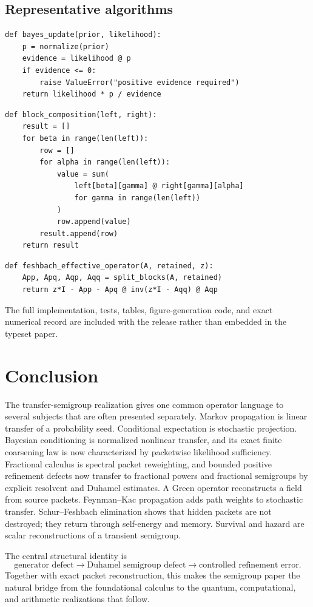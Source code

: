 \documentclass[11pt]{article}
\theoremstyle{definition}
\theoremstyle{remark}
\begin{document}
\subsection{Representative algorithms}

\begin{lstlisting}[caption={Normalized finite Bayesian update.}]
def bayes_update(prior, likelihood):
    p = normalize(prior)
    evidence = likelihood @ p
    if evidence <= 0:
        raise ValueError("positive evidence required")
    return likelihood * p / evidence
\end{lstlisting}

\begin{lstlisting}[caption={Packet block composition.}]
def block_composition(left, right):
    result = []
    for beta in range(len(left)):
        row = []
        for alpha in range(len(left)):
            value = sum(
                left[beta][gamma] @ right[gamma][alpha]
                for gamma in range(len(left))
            )
            row.append(value)
        result.append(row)
    return result
\end{lstlisting}

\begin{lstlisting}[caption={Finite Schur-Feshbach effective operator.}]
def feshbach_effective_operator(A, retained, z):
    App, Apq, Aqp, Aqq = split_blocks(A, retained)
    return z*I - App - Apq @ inv(z*I - Aqq) @ Aqp
\end{lstlisting}

The full implementation, tests, tables, figure-generation code, and exact numerical record are included with the release rather than embedded in the typeset paper.

\section{Conclusion}

The transfer-semigroup realization gives one common operator language to several subjects that are often presented separately. Markov propagation is linear transfer of a probability seed. Conditional expectation is stochastic projection. Bayesian conditioning is normalized nonlinear transfer, and its exact finite coarsening law is now characterized by packetwise likelihood sufficiency. Fractional calculus is spectral packet reweighting, and bounded positive refinement defects now transfer to fractional powers and fractional semigroups by explicit resolvent and Duhamel estimates. A Green operator reconstructs a field from source packets. Feynman--Kac propagation adds path weights to stochastic transfer. Schur--Feshbach elimination shows that hidden packets are not destroyed; they return through self-energy and memory. Survival and hazard are scalar reconstructions of a transient semigroup.

The central structural identity is
\[
\boxed{
\text{generator defect}
\longrightarrow
\text{Duhamel semigroup defect}
\longrightarrow
\text{controlled refinement error}.
}
\]
Together with exact packet reconstruction, this makes the semigroup paper the natural bridge from the foundational calculus to the quantum, computational, and arithmetic realizations that follow.
\end{document}
